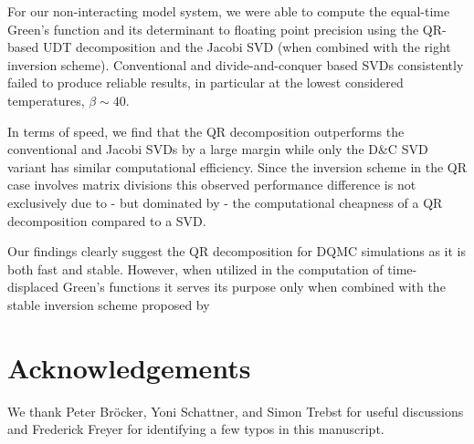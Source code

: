 \documentclass[%
 reprint,
superscriptaddress,
citeautoscript,
showpacs,
 amsmath,amssymb,
 aps,
 prb,
longbibliography,
]{revtex4-2}
\begin{document}
For our non-interacting model system, we were able to compute the equal-time Green's function and its determinant to floating point precision using the QR-based UDT decomposition and the Jacobi SVD (when combined with the right inversion scheme). Conventional and divide-and-conquer based SVDs consistently failed to produce reliable results, in particular at the lowest considered temperatures, $\beta \sim 40$.

In terms of speed, we find that the QR decomposition outperforms the conventional and Jacobi SVDs by a large margin while only the D\&C SVD variant has similar computational efficiency. Since the inversion scheme in the QR case involves matrix divisions this observed performance difference is not exclusively due to - but dominated by - the computational cheapness of a QR decomposition compared to a SVD.

Our findings clearly suggest the QR decomposition for DQMC simulations as it is both fast and stable. However, when utilized in the computation of time-displaced Green's functions it serves its purpose only when combined with the stable inversion scheme proposed by  ~\citet{Loh1989}

\section{Acknowledgements}

We thank Peter Bröcker, Yoni Schattner, and Simon Trebst for useful discussions and Frederick Freyer for identifying a few typos in this manuscript. %

\clearpage

\end{document}
